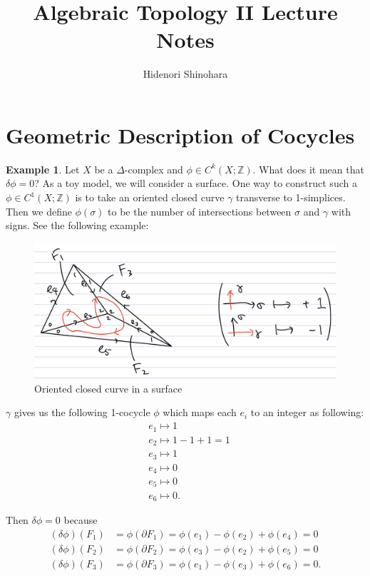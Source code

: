 \documentclass[psamsfonts]{amsart}
\theoremstyle{definition}
\newtheorem{exmp}[thm]{Example}
\theoremstyle{rem}
\numberwithin{equation}{section}
\begin{document}
\title{Algebraic Topology II Lecture Notes}
\author{Hidenori Shinohara}

\maketitle
\tableofcontents

\section{Geometric Description of Cocycles}

\begin{exmp}
  Let $X$ be a $\Delta$-complex and $\phi \in C^k(X; \mathbb{Z})$.
  What does it mean that $\delta \phi = 0$?
  As a toy model, we will consider a surface.
  One way to construct such a $\phi \in C^1(X; \mathbb{Z})$ is to take an oriented closed curve $\gamma$ transverse to 1-simplices.
  Then we define $\phi(\sigma)$ to be the number of intersections between $\sigma$ and $\gamma$ with signs.
  See the following example:

  \begin{figure}[!htb]
    \includegraphics[width=.7\linewidth]{img/geometric_description_cocycle.jpeg}
    \caption{Oriented closed curve in a surface}
    \label{fig:cocycle}
  \end{figure}

  $\gamma$ gives us the following 1-cocycle $\phi$ which maps each $e_i$ to an integer as following:
  \begin{align*}
    & e_1 \mapsto 1 \\
    & e_2 \mapsto 1 - 1 + 1 = 1 \\
    & e_3 \mapsto 1 \\
    & e_4 \mapsto 0 \\
    & e_5 \mapsto 0 \\
    & e_6 \mapsto 0.
  \end{align*}

  Then $\delta\phi = 0$ because
  \begin{align*}
    (\delta\phi)(F_1) &= \phi(\partial F_1) = \phi(e_1) - \phi(e_2) + \phi(e_4) = 0 \\
    (\delta\phi)(F_2) &= \phi(\partial F_2) = \phi(e_3) - \phi(e_2) + \phi(e_5) = 0 \\
    (\delta\phi)(F_3) &= \phi(\partial F_3) = \phi(e_1) - \phi(e_3) + \phi(e_6) = 0.
  \end{align*}


\end{exmp}
\end{document}
